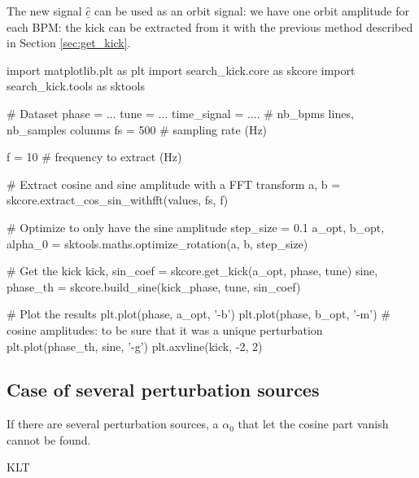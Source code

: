 \documentclass[12pt,a4paper]{article}
\renewcommand{\vec}[1]{\underline{#1}}
\begin{document}
	The new signal $\vec{\hat{c}}$ can be used as an orbit signal: we have one orbit amplitude for each BPM: the kick can be extracted from it with the previous method described in Section \ref{sec:get_kick}.
	
	\begin{python}[caption={Perturbation localisation, f = 10 Hz}]
		import matplotlib.plt as plt
		import search_kick.core as skcore
		import search_kick.tools as sktools
		
		# Dataset
		phase = ...
		tune = ...
		time_signal = ....  # nb_bpms lines, nb_samples colunms
		fs = 500  # sampling rate (Hz)
		
		f = 10  # frequency to extract (Hz)
		
		# Extract cosine and sine amplitude with a FFT transform
		a, b = skcore.extract_cos_sin_withfft(values, fs, f)
	
		# Optimize to only have the sine amplitude
		step_size = 0.1
		a_opt, b_opt, alpha_0 = sktools.maths.optimize_rotation(a, b, step_size)
		
		# Get the kick
		kick, sin_coef = skcore.get_kick(a_opt, phase, tune)
		sine, phase_th = skcore.build_sine(kick_phase, tune, sin_coef)
		
		# Plot the results
		plt.plot(phase, a_opt, '-b')
		plt.plot(phase, b_opt, '-m')  # cosine amplitudes: to be sure that it was a unique perturbation
		plt.plot(phase_th, sine, '-g')
		plt.axvline(kick, -2, 2)

	\end{python}
	
	\subsection{Case of several perturbation sources}
	If there are several perturbation sources, a $\alpha_0$ that let the cosine part vanish cannot be found. 
	
	KLT~\cite{book:wang_2012}
	
	
	
\end{document}

